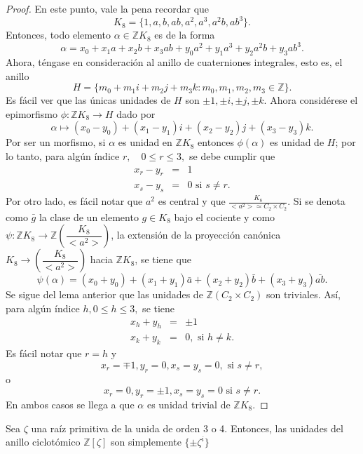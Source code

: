 \begin{proof}
En este punto, vale la pena recordar que \[ K_8 = \{ 1,a,b,ab,a^2,a^3,a^2b,ab^3  \}.\] Entonces, todo elemento $\alpha \in \mathds{Z}K_8$ es de la forma \[ \alpha = x_0 + x_1a + x_2b + x_3ab + y_0a^2 + y_1a^3 + y_2a^2b + y_3ab^3.\] Ahora, téngase en consideración al anillo de cuaterniones integrales, esto es, el anillo \[ H = \{ m_0 + m_1i+ m_2j +m_3k \colon m_0, m_1, m_2, m_3 \in \mathds{Z} \}.\] Es fácil ver que las únicas unidades de $H$ son $\pm 1, \pm i, \pm j, \pm k.$ Ahora considérese el epimorfismo $\phi \colon \mathds{Z}K_8 \to H$ dado por \[ \alpha \mapsto (x_0 - y_0) + (x_1 - y_1)i + (x_2 - y_2)j +(x_3-y_3)k. \]
Por ser un morfismo, si $\alpha$ es unidad en $\mathds{Z}K_8$ entonces $\phi(\alpha)$ es unidad de $H$; por lo tanto, para algún índice $r, \quad 0 \leq r \leq 3,$ se debe cumplir que 
\begin{eqnarray*}
x_r - y_r &=&1 \\  
x_s - y_s &=& 0 \mbox{ si } s \neq r .
\end{eqnarray*}
Por otro lado, es fácil notar que $a^2$  es central y que $\frac{K_8}{<a^2> \simeq C_2 \times C_2}.$ Si se denota como $\bar{g}$ la clase de un elemento $g \in K_8$ bajo el cociente y como $\psi \colon \mathds{Z}K_8 \to \mathds{Z}\left(\dfrac{K_8}{<a^2>}\right)$, la extensión de la proyección canónica $K_8 \to \left( \dfrac{K_8}{<a^2>} \right)$ hacia $\mathds{Z}K_8$, se tiene que \[ \psi(\alpha) = (x_0 + y_0) +(x_1 + y_1) \bar{a} + (x_2 + y_2)\bar{b} + (x_3+y_3)\bar{ab}.\] Se sigue del lema anterior que las unidades de $\mathds{Z}(C_2\times C_2)$ son triviales. Así, para algún índice $h, 0\leq h \leq 3,$ se tiene 
 \begin{eqnarray*}
 x_h + y_h &=& \pm 1 \\
 x_k + y_k &=& 0, \mbox{ si } h \neq k.
 \end{eqnarray*}
 Es fácil notar que $r = h$ y \[ x_r = \mp 1, y_r =0, x_s = y_s =0, \mbox{ si } s \neq r, \] o 
 \[ x_r =0 , y_r = \pm 1, x_s = y_s = 0 \mbox{ si } s \neq r.  \] En ambos casos se llega a que $\alpha$ es unidad trivial de $\mathds{Z}K_8$.
\end{proof}
\begin{lema}\label{lema:tercerLema}
Sea $\zeta$ una raíz primitiva de la unida de orden 3 o 4. Entonces, las unidades del anillo ciclotómico $\mathds{Z}[\zeta]$ son simplemente $\{\pm \zeta^{i} \}$
\end{lema}
